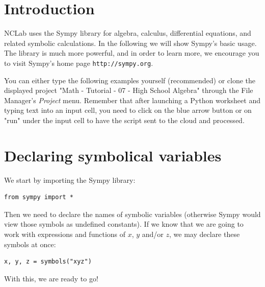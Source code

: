\documentclass{article}
\begin{document}
\section{Introduction}

NCLab uses the Sympy library for algebra, calculus, differential equations, and related 
symbolic calculations. In the following we will show Sympy's basic usage. The library 
is much more powerful, and in order to learn more, we encourage you to visit Sympy's
home page {\tt http://sympy.org}. 

You can either type the 
following examples yourself (recommended) or clone the displayed project 
"Math - Tutorial - 07 - High School Algebra" through the File Manager's
{\em Project} menu. Remember that after launching a Python worksheet and 
typing text into an input cell, you need to click on the blue arrow button 
or on "run" under the input cell to have the script sent to the cloud and processed.

\section{Declaring symbolical variables}

We start by importing the Sympy library:

\begin{verbatim}
from sympy import *
\end{verbatim}
Then we need to declare the names of symbolic variables (otherwise Sympy would 
view those symbols as undefined constants). If we know that we are going to work 
with expressions and functions of $x$, $y$ and/or $z$, we may declare these symbols 
at once:
\begin{verbatim}
x, y, z = symbols("xyz")
\end{verbatim}
With this, we are ready to go!
\end{document}
